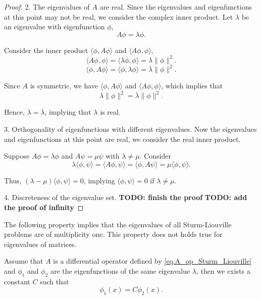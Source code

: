 \begin{proof}
    2.  The eigenvalues of $A$ are real. Since the eigenvalues and eigenfunctions at this point may not be real, we consider the complex inner product. Let $\lambda$ be an eigenvalue with eigenfunction $\phi$,
    \begin{equation}
    A\phi = \lambda \phi.
    \end{equation}
    
    Consider the inner product $\langle \phi, A\phi \rangle$ and $\langle A\phi, \phi \rangle$,
    \begin{equation}
    \langle A\phi, \phi \rangle =  \langle \lambda\phi, \phi \rangle = \lambda \|\phi\|^2.
    \end{equation}
    \begin{equation}
        \langle \phi, A\phi \rangle =  \langle \phi, \lambda\phi \rangle = \overline{\lambda} \|\phi\|^2.
    \end{equation}
    
    Since $A$ is symmetric, we have $\langle \phi, A\phi \rangle$ and $\langle A\phi, \phi \rangle$, which implies that
    \begin{equation}
    \lambda \|\phi\|^2 = \overline{\lambda} \|\phi\|^2.
    \end{equation}
    
    Hence, $\lambda = \overline{\lambda}$, implying that $\lambda$ is real.
    
    3. Orthogonality of eigenfunctions with different eigenvalues. Now the eigenvalues and eigenfunctions at this point are real, we consider the real inner product.
    
    Suppose $A\phi = \lambda \phi$ and $A\psi = \mu \psi$ with $\lambda \neq \mu$. Consider
    \begin{equation}
    \lambda \langle \phi, \psi \rangle = \langle A\phi, \psi \rangle = \langle \phi, A\psi \rangle = \mu \langle \phi, \psi \rangle.
    \end{equation}
    
    Thus, $(\lambda - \mu) \langle \phi, \psi \rangle = 0$, implying $\langle \phi, \psi \rangle = 0$ if $\lambda \neq \mu$.
    
    4. Discreteness of the eigenvalue set. 
    \textbf{TODO: finish the proof} \textbf{TODO: add the proof of infinity}
\end{proof}

The following property implies that the eigenvalues of all Sturm-Liouville problems are of multiplicity one. This property does not holds true for eigenvalues of matrices.
\begin{theorem}\label{th.SL_2} Assume that $A$ is a differential operator defined by \eqref{eq.A_op_Sturm_Liouville} and $\phi_1$ and $\phi_2$ are the eigenfunctions of the same eigenvalue $\lambda$, then we exists a constant $C$ such that 
    \begin{equation}\label{eq.SL_multiplicity_one}
        \phi_1(x) = C\phi_2(x).
    \end{equation}
\end{theorem}


